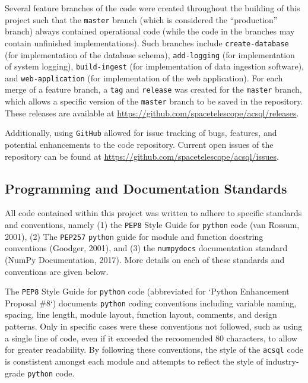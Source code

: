 \documentclass[10pt,journal,compsoc]{IEEEtran}
\begin{document}
Several feature branches of the code were created throughout the building of this project
such that the \texttt{master} branch (which is considered the ``production'' branch)
always contained operational code (while the code in the branches may contain unfinished
implementations).  Such branches include \texttt{create-database} (for implementation of
the database schema), \texttt{add-logging} (for implementation of system logging),
\texttt{build-ingest} (for implementation of data ingestion software), and
\texttt{web-application} (for implementation of the web application).  For each merge of a
feature branch, a \texttt{tag} and \texttt{release} was created for the \texttt{master} branch,
which allows a specific version of the \texttt{master} branch to be saved in the
repository.  These releases are available at
\url{https://github.com/spacetelescope/acsql/releases}.

Additionally, using \texttt{GitHub} allowed for issue tracking of bugs, features, and
potential enhancements to the code repository.  Current open issues of the repository
can be found at \url{https://github.com/spacetelescope/acsql/issues}.


\subsection{Programming and Documentation Standards}

All code contained within this project was written to adhere to specific standards and
conventions, namely (1) the \texttt{PEP8} Style Guide for \texttt{python} code (van Rossum, 2001),
(2) The \texttt{PEP257} \texttt{python} guide for module and function docstring conventions
(Goodger, 2001), and (3) the \texttt{numpydocs} documentation standard (NumPy Documentation,
2017).  More details on each of these standards and conventions are given below.

The \texttt{PEP8} Style Guide for \texttt{python} code (abbreviated for `Python Enhancement
Proposal \#8`) documents \texttt{python} coding conventions including variable naming,
spacing, line length, module layout, function layout, comments, and design patterns.  Only
in specific cases were these conventions not followed, such as using a single line of code,
even if it exceeded the recoomended 80 characters, to allow for greater readability.  By
following these conventions, the style of the \texttt{acsql} code is constistent amongst
each module and attempts to reflect the style of industry-grade \texttt{python} code.
\end{document}
